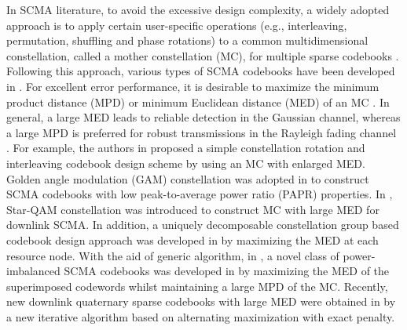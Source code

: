 \documentclass[journal]{IEEEtran}
\begin{document}
  In SCMA literature, to avoid the excessive design complexity, a widely adopted approach is to apply certain  user-specific operations (e.g., interleaving,    permutation, shuffling and phase rotations) to a common multidimensional constellation, called a   mother constellation (MC), for multiple sparse codebooks   \cite{nikopour2013sparse,taherzadeh2014scma}.   Following this approach, various types of SCMA codebooks have been developed in \cite{mheich2018design,cai2016multi,deka2020design,yu2015optimized,Zhang,li2020design,chen2020design}.  For excellent error performance, it is desirable to maximize the   minimum product distance (MPD) or minimum Euclidean distance (MED) of an MC \cite{boutros1996good}. In general, a large MED  leads to reliable detection in the Gaussian   channel, whereas a large MPD is preferred for robust transmissions in the Rayleigh fading channel \cite{WenDesigning}.
For example, the authors in \cite{cai2016multi} proposed a simple constellation rotation and interleaving  codebook design scheme  by using  an MC with enlarged MED.  
Golden angle modulation (GAM)  constellation was adopted in   \cite{mheich2018design}  to construct SCMA codebooks with low  peak-to-average power ratio (PAPR) properties.  
In \cite{yu2015optimized}, Star-QAM constellation was introduced to construct MC with large MED for downlink SCMA.   
In addition, a  uniquely decomposable constellation group   based codebook design approach was developed  in \cite{Zhang} by maximizing the MED at each resource node. With the aid of generic algorithm, in \cite{li2020design}, a  novel class of power-imbalanced SCMA codebooks  was developed in \cite{li2020design} by maximizing    the MED of the superimposed codewords whilst maintaining a large  MPD of the MC.   Recently, new downlink  quaternary sparse codebooks with large MED were obtained in \cite{huang2021downlink}  by a new iterative algorithm based on alternating maximization with exact penalty.     %
\end{document}
